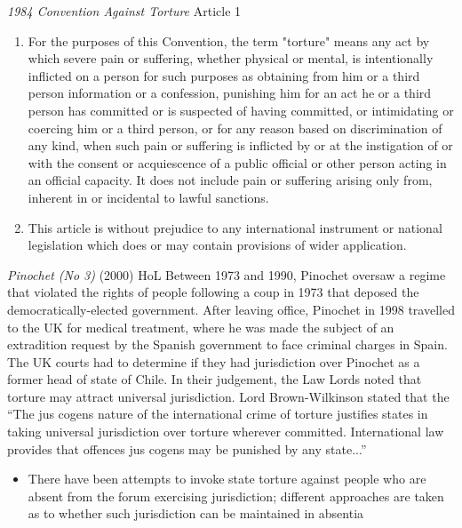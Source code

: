 \begin{conventiondetails}{\textit{1984 Convention Against Torture} Article 1}
    \flushleft
    \begin{enumerate}
        \item For the purposes of this Convention, the term "torture" means any act by which severe pain or suffering, whether physical or mental, is intentionally inflicted on a person for such purposes as obtaining from him or a third person information or a confession, punishing him for an act he or a third person has committed or is suspected of having committed, or intimidating or coercing him or a third person, or for any reason based on discrimination of any kind, when such pain or suffering is inflicted by or at the instigation of or with the consent or acquiescence of a public official or other person acting in an official capacity. It does not include pain or suffering arising only from, inherent in or incidental to lawful sanctions.
        \item This article is without prejudice to any international instrument or national legislation which does or may contain provisions of wider application.
    \end{enumerate}
\end{conventiondetails}

\begin{casedetails}{\textit{Pinochet (No 3)} (2000) HoL}
    \flushleft
    Between 1973 and 1990, Pinochet oversaw a regime that violated the rights of people following a coup in 1973 that deposed the democratically-elected government. After leaving office, Pinochet in 1998 travelled to the UK for medical treatment, where he was made the subject of an extradition request by the Spanish government to face criminal charges in Spain. The UK courts had to determine if they had jurisdiction over Pinochet as a former head of state of Chile. In their judgement, the Law Lords noted that torture may attract universal jurisdiction. Lord Brown-Wilkinson stated that the ``The jus cogens nature of the international crime of torture justifies states in taking universal jurisdiction over torture wherever committed. International law provides that offences jus cogens may be punished by any state...''
\end{casedetails}

\begin{itemize}
    \item There have been attempts to invoke state torture against people who are absent from the forum exercising jurisdiction; different approaches are taken as to whether such jurisdiction can be maintained in absentia
\end{itemize}

